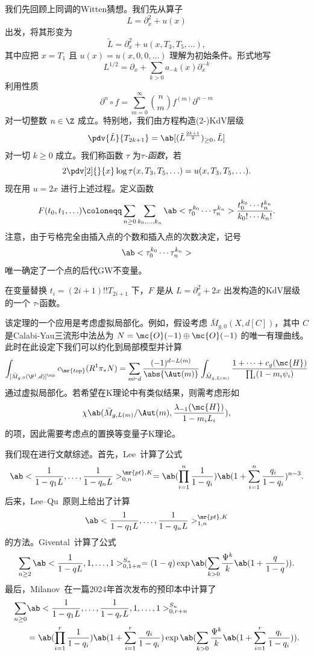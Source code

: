 我们先回顾上同调的Witten猜想。我们先从算子
\[ L = \partial_x^2 + u(x) \]
出发，将其形变为
\[ \tilde{L} = \partial_x^2 + u(x, T_3, T_5, \ldots), \]
其中应把 \(x = T_1\) 且 \(u(x) = u(x, 0, 0,\ldots)\) 理解为初始条件。形式地写
\[ L^{1/2} = \partial_x + \sum_{k > 0} a_{-k}(x) \partial_x^{-k} \]
利用性质
\[ \partial^n \circ f = \sum_{m = 0}^{\infty} \binom{n}{m} f^{(m)} \partial^{n-m} \]
对一切整数 \(n \in \Z\) 成立。特别地，我们由方程构造(2-)KdV层级
\[ \pdv{\tilde{L}}{T_{2k+1}} = \ab[(\tilde{L}^{\frac{2k+1}{2}})_{\geq 0}, \tilde{L}] \]
对一切 \(k \geq 0\) 成立。我们称函数 \(\tau\) 为\textit{\(\tau\)-函数}，若
\[ 2 \pdv[2]{}{x}\log \tau(x, T_3, T_5, \ldots) = u(x, T_3, T_5, \ldots). \]
现在用 \(u = 2x\) 进行上述过程。定义函数
\[ F(t_0, t_1, \ldots) \coloneqq \sum_{n \geq 0} \sum_{k_0, \ldots, k_n} \ab<\tau_0^{k_0} \cdots \tau_n^{k_n}> \frac{t_0^{k_0} \cdots t_n^{k_n}}{k_0! \cdots k_n!}. \]
注意，由于亏格完全由插入点的个数和插入点的次数决定，记号
\[ \ab<\tau_0^{k_0} \cdots \tau_n^{k_n}> \]
唯一确定了一个点的后代GW不变量。

\begin{thm}
    在变量替换 \(t_i = (2i+1)!! T_{2i+1}\) 下，\(F\) 是从 \(L = \partial_x^2 + 2x\) 出发构造的KdV层级的一个 \(\tau\)-函数。
\end{thm}

该定理的一个应用是考虑虚拟局部化。例如，假设考虑 \(\bar{M}_{g,0}(X, d[C])\)，其中 \(C\) 是Calabi-Yau三流形中法丛为 \(N = \mc{O}(-1)\oplus \mc{O}(-1)\) 的唯一有理曲线。此时在此设定下我们可以约化到局部模型并计算
\begin{align*}
    \int_{[\bar{M}_{g,0}(\P^1, d)]^{\vir}} c_{\mr{top}}(R^1 \pi_* N) = \sum_{m \vdash d} \frac{(-1)^{d-L(m)}}{\abs{\Aut(m)}} \int_{\bar{M}_{g, L(m)}} \frac{1 + \cdots + c_g(\mc{H})}{\prod_i (1-m_i \psi_i)}
\end{align*}
通过虚拟局部化。若希望在K理论中有类似结果，则需考虑形如
\[ \chi\ab(\bar{M}_{g, L(m)}/\Aut(m), \frac{\lambda_{-1}(\mc{H})}{1-m_i L_i}), \]
的项，因此需要考虑点的置换等变量子K理论。

我们现在进行文献综述。首先，Lee~\cite{Lee1997}计算了公式
\[ \ab<\frac{1}{1-q_1 L}, \ldots, \frac{1}{1-q_n L}>_{0,n}^{\mr{pt}, K} = \ab(\prod_{i=1}^n \frac{1}{1-q_i}) \ab(1 + \sum_{i=1}^n \frac{q_i}{1-q_i})^{n-3}. \]
后来，Lee--Qu~\cite{LeeQu2014}原则上给出了计算
\[ \ab<\frac{1}{1-q_1 L}, \ldots, \frac{1}{1-q_n L}>_{1,n}^{\mr{pt}, K} \]
的方法。Givental~\cite{Givental2017K1}计算了公式
\[ \sum_{n \geq 2} \ab<\frac{1}{1-q L}, 1, \ldots, 1>_{0,1+n}^{S_n} = (1-q) \exp\ab(\sum_{k > 0} \frac{\Psi^k}{k} \ab(1 + \frac{q}{1-q})). \]
最后，Milanov~\cite{Milanov2025}在一篇2024年首次发布的预印本中计算了
\begin{align*}
    \sum_{n \geq 0}& \ab<\frac{1}{1-q_1 L}, \ldots, \frac{1}{1-q_r L}, 1, \ldots, 1>_{0,r+n}^{S_n} \\
    &= \ab(\prod_{i=1}^{r} \frac{1}{1-q_i})\ab(1 + \sum_{i=1}^r \frac{q_i}{1-q_i}) \exp\ab(\sum_{k > 0} \frac{\Psi^k}{k} \ab(1 + \sum_{i=1}^r \frac{q_i}{1-q_i})).
\end{align*}

